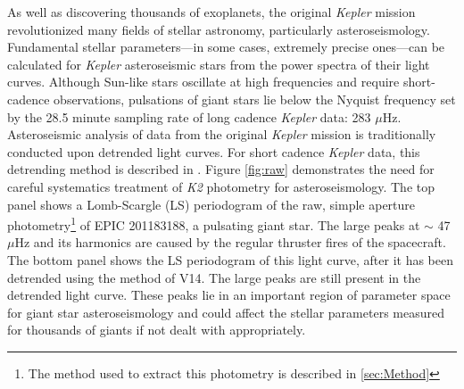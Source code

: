 \documentclass[useAMS, usenatbib, preprint, 12pt]{aastex}
\begin{document}
As well as discovering thousands of exoplanets, the original {\it Kepler}
mission revolutionized many fields of stellar astronomy, particularly
asteroseismology.
Fundamental stellar parameters---in some cases, extremely precise ones---can
be calculated for {\it Kepler} asteroseismic stars from the power spectra of
their light curves.
Although Sun-like stars oscillate at high frequencies and require
short-cadence observations, pulsations of giant stars lie below the Nyquist
frequency set by the 28.5 minute sampling rate of long cadence {\it Kepler}
data: 283 $\mu$Hz.
Asteroseismic analysis of data from the original {\it Kepler} mission is
traditionally conducted upon detrended light curves.
For short cadence {\it Kepler} data, this detrending method is described in
\citet{Garcia2011}.
Figure \ref{fig:raw} demonstrates the need for careful systematics treatment
of {\it K2} photometry for asteroseismology.
The top panel shows a Lomb-Scargle (LS) periodogram of the raw, simple aperture
photometry\footnote{The method used to extract this photometry is described in
\textsection \ref{sec:Method}} of EPIC 201183188, a pulsating giant star.
The large peaks at $\sim$ 47 $\mu$Hz and its harmonics are caused by the
regular thruster fires of the spacecraft.
The bottom panel shows the LS periodogram of this light curve, after
it has been detrended using the method of V14.
The large peaks are still present in the detrended light curve.
These peaks lie in an important region of parameter space for giant star
asteroseismology and could affect the stellar parameters measured for thousands
of giants if not dealt with appropriately.
\end{document}
